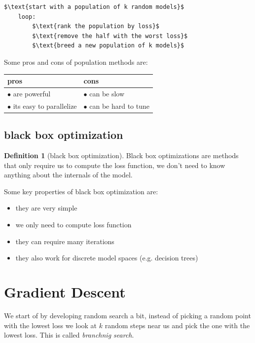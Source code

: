 \documentclass[12pt]{article}
\theoremstyle{definition}
\newtheorem{definition}{Definition}[section]
\begin{document}
\begin{lstlisting}[caption=evolutionary algorithms]
    $\text{start with a population of k random models}$
    loop:
        $\text{rank the population by loss}$
        $\text{remove the half with the worst loss}$
        $\text{breed a new population of k models}$
\end{lstlisting}

Some pros and cons of population methods are:

\begin{center}
    \begin{tabular}{|l|l|}
        \hline
        pros & cons \\
        \hline
        $\bullet$ are powerful & $\bullet$ can be slow \\
        $\bullet$ its easy to parallelize & $\bullet$ can be hard to tune \\
        \hline
    \end{tabular}
\end{center}

\subsection{black box optimization}

\begin{definition}[black box optimization]
    Black box optimizations are methods that only require us to compute the loss function, we don't need to know anything about the internals of the model.
\end{definition}

Some key properties of black box optimization are:
\begin{itemize}[leftmargin=*, noitemsep]
    \item they are very simple 
    \item we only need to compute loss function 
    \item they can require many iterations 
    \item they also work for discrete model spaces (e.g. decision trees)
\end{itemize}

\newpage

\section{Gradient Descent}

We start of by developing random search a bit, instead of picking a random point with the lowest loss we look at $k$ random steps near us and pick the one with the lowest loss. This is called \textit{branchnig search}.
\end{document}
